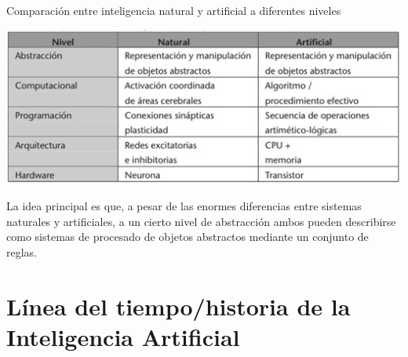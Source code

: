 \begin{table}
	\caption{Comparación entre inteligencia natural y artificial a diferentes niveles } \citep{Benitez}
	\centering
	\includegraphics{Img/tabla1.jpg}
\end{table}

La idea principal es que, a pesar de las enormes diferencias entre sistemas naturales y artificiales, a un cierto nivel de abstracción ambos pueden describirse como sistemas de procesado de objetos abstractos mediante un conjunto de reglas. \bigskip


\section{L\'inea del tiempo/historia de la Inteligencia Artificial}

